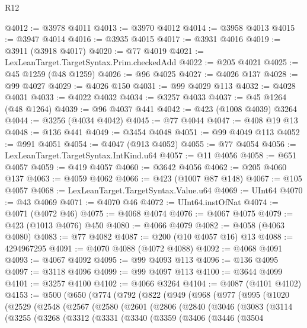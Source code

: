 \begin{lexlean}{R12}
\begin{coremodule}
@4012 := @3978 @4011
@4013 := @3970 @4012
@4014 := @3958 @4013
@4015 := @3947 @4014
@4016 := @3935 @4015
@4017 := @3931 @4016
@4019 := @3911 (@3918 @4017)
@4020 := @77 @4019
@4021 := LexLeanTarget.TargetSyntax.Prim.checkedAdd
@4022 := @205 @4021
@4025 := @45 @1259 (@48 @1259)
@4026 := @96 @4025
@4027 := @4026 @137
@4028 := @99 @4027
@4029 := @4026 @150
@4031 := @99 @4029 @113
@4032 := @4028 @4031
@4033 := @4022 @4032
@4034 := @3257 @4033
@4037 := @45 @1264 (@48 @1264)
@4039 := @96 @4037 @441
@4042 := @423 (@1008 @4039) @3264
@4044 := @3256 (@4034 @4042)
@4045 := @77 @4044
@4047 := @408 @19 @13
@4048 := @136 @441
@4049 := @3454 @4048
@4051 := @99 @4049 @113
@4052 := @991 @4051
@4054 := @4047 (@913 @4052)
@4055 := @77 @4054
@4056 := LexLeanTarget.TargetSyntax.IntKind.u64
@4057 := @11 @4056
@4058 := @651 @4057
@4059 := @419 @4057
@4060 := @3642 @4056
@4062 := @205 @4060 @137
@4063 := @4059 @4062
@4066 := @423 (@1007 @87 @148)
@4067 := @105 @4057
@4068 := LexLeanTarget.TargetSyntax.Value.u64
@4069 := UInt64
@4070 := @43 @4069
@4071 := @4070 @46
@4072 := UInt64.instOfNat
@4074 := @4071 (@4072 @46)
@4075 := @4068 @4074
@4076 := @4067 @4075
@4079 := @423 (@1013 @4076) @450
@4080 := @4066 @4079
@4082 := @4058 (@4063 @4080)
@4083 := @77 @4082
@4087 := @200 (@10 @4057 @16) @13
@4088 := 4294967295
@4091 := @4070 @4088 (@4072 @4088)
@4092 := @4068 @4091
@4093 := @4067 @4092
@4095 := @99 @4093 @113
@4096 := @136 @4095
@4097 := @3118 @4096
@4099 := @99 @4097 @113
@4100 := @3644 @4099
@4101 := @3257 @4100
@4102 := @4066 @3264
@4104 := @4087 (@4101 @4102)
@4153 := @500
    (@650
      (@774
        (@792
          (@822
            (@949
              (@968
                (@977
                  (@995
                    (@1020
                      (@2529
                        (@2548
                          (@2567
                            (@2580
                              (@2601
                                (@2806
                                  (@2840
                                    (@3046
                                      (@3083
                                        (@3114
                                          (@3255
                                            (@3268
                                              (@3312
                                                (@3331
                                                  (@3340
                                                    (@3359
                                                      (@3406
                                                        (@3446
                                                          (@3504

\end{coremodule}
\end{lexlean}
